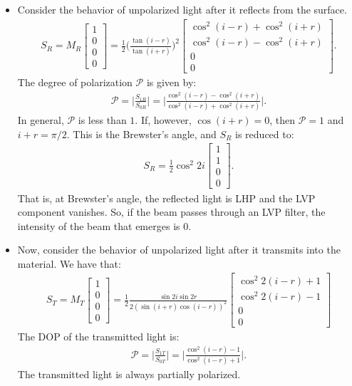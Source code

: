 \documentclass[10pt]{article}
\begin{document}
\begin{itemize}
		\item Consider the behavior of unpolarized light after it reflects from the surface.
		\begin{align*}
			S_R = M_R \begin{bmatrix}
				1 \\ 0 \\ 0 \\ 0
			\end{bmatrix}
			= \frac{1}{2} \bigg( \frac{\tan (i-r)}{\tan (i+r)} \bigg)^2 \begin{bmatrix}
				\cos^2 (i-r) + \cos^2 (i+r) \\
				\cos^2 (i-r) - \cos^2 (i+r) \\
				0 \\
				0 
			\end{bmatrix}.
		\end{align*}
		The degree of polarization $\mathcal{P}$ is given by:
		\begin{align*}
			\mathcal{P} 
			= \bigg| \frac{S_{1R}}{S_{0R}} \bigg| 
			= \bigg| \frac{\cos^2 (i-r) - \cos^2(i+r)}{\cos^2(i-r) + \cos^2 (i+r)} \bigg|.
		\end{align*}
		In general, $\mathcal{P}$ is less than $1$.  If, however, $\cos (i+r) = 0$, then $\mathcal{P} = 1$ and $i+r = \pi/2$.  This is the Brewster's angle, and $S_R$ is reduced to:
		\begin{align*}
			S_R = \frac{1}{2} \cos^2 2i \begin{bmatrix}
				1 \\ 1 \\ 0 \\ 0
			\end{bmatrix}.
		\end{align*}
		That is, at Brewster's angle, the reflected light is LHP and the LVP component vanishes.  So, if the beam passes through an LVP filter, the intensity of the beam that emerges is $0$.

		\item Now, consider the behavior of unpolarized light after it transmits into the material.  We have that:
		\begin{align*}
			S_T 
			= M_T \begin{bmatrix}
				1 \\ 0 \\ 0 \\ 0
			\end{bmatrix}
			= \frac{1}{2} \frac{\sin 2i \sin 2r}{2(\sin(i+r) \cos(i-r))^2}
			\begin{bmatrix}
				\cos^2 2(i-r) + 1 \\
				\cos^2 2(i-r) - 1 \\
				0 \\
				0
			\end{bmatrix}
		\end{align*}
		The DOP of the transmitted light is:
		\begin{align*}
			\mathcal{P} 
			= \bigg| \frac{S_{1T}}{S_{0T}} \bigg| 
			= \bigg| \frac{\cos^2(i-r)-1}{\cos^2(i-r) + 1} \bigg|.
		\end{align*}
		The transmitted light is always partially polarized.


\end{itemize}
\end{document}
